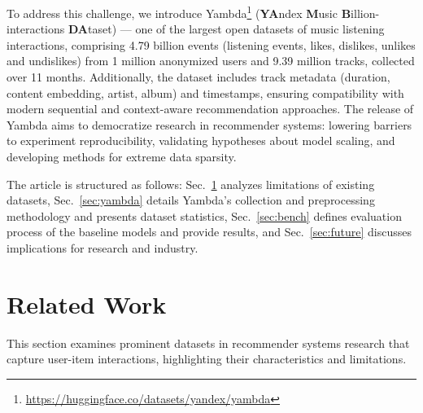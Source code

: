 \documentclass[sigconf,authorversion,nonacm]{acmart}
\begin{document}
To address this challenge, we introduce Yambda\footnote{\url{https://huggingface.co/datasets/yandex/yambda}} (\textbf{YA}ndex \textbf{M}usic \textbf{B}illion-interactions \textbf{DA}taset) --- one of the largest open datasets of music listening interactions, comprising 4.79 billion events (listening events, likes, dislikes, unlikes and undislikes) from 1 million anonymized users and 9.39 million tracks, collected over 11 months. Additionally, the dataset includes track metadata (duration, content embedding, artist, album) and timestamps, ensuring compatibility with modern sequential and context-aware recommendation approaches. The release of Yambda aims to democratize research in recommender systems: lowering barriers to experiment reproducibility, validating hypotheses about model scaling, and developing methods for extreme data sparsity.

The article is structured as follows: Sec.~\ref{sec:related} analyzes limitations of existing datasets, Sec.~\ref{sec:yambda} details Yambda’s collection and preprocessing methodology and presents dataset statistics, Sec.~\ref{sec:bench} defines evaluation process of the  baseline models and provide results, and Sec.~\ref{sec:future} discusses implications for research and industry.

\section{Related Work}\label{sec:related}
This section examines prominent datasets in recommender systems research that capture user-item interactions, highlighting their characteristics and limitations.
\end{document}
